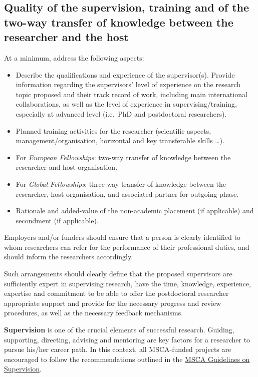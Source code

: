 \documentclass[12pt,draftproposal]{msca-pf}
\begin{document}
\subsection{Quality of the supervision, training and of the two-way transfer of
    knowledge between the researcher and the host}
\label{ssc:excellence:supervision}

\begin{mscaexplanation}
At a minimum, address the following aspects:

\begin{itemize}
    \item Describe the qualifications and experience of the supervisor(s).
    Provide information regarding the supervisors' level of experience on the
    research topic proposed and their track record of work, including main
    international collaborations, as well as the level of experience in
    supervising/training, especially at advanced level (i.e.\ PhD and postdoctoral
    researchers).

    \item Planned training activities for the researcher (scientific aspects,
    management/organisation, horizontal and key transferable skills \dots).

    \item For \emph{European Fellowships}: two-way transfer of knowledge between
    the researcher and host organisation.

    \item For \emph{Global Fellowships}: three-way transfer of knowledge between
    the researcher, host organisation, and associated partner for outgoing phase.

    \item Rationale and added-value of the non-academic placement (if applicable)
    and secondment (if applicable).
\end{itemize}

Employers and/or funders should ensure that a person is clearly identified to
whom researchers can refer for the performance of their professional duties, and
should inform the researchers accordingly.

Such arrangements should clearly define that the proposed supervisors are
sufficiently expert in supervising research, have the time, knowledge, experience,
expertise and commitment to be able to offer the postdoctoral researcher
appropriate support and provide for the necessary progress and review procedures,
as well as the necessary feedback mechanisms.

\textbf{Supervision} is one of the crucial elements of successful research. Guiding,
supporting, directing, advising and mentoring are key factors for a researcher
to pursue his/her career path. In this context, all MSCA-funded projects are
encouraged to follow the recommendations outlined in the
\href{https://data.europa.eu/doi/10.2766/508311}{MSCA Guidelines on Supervision}.
\end{mscaexplanation}
\end{document}
